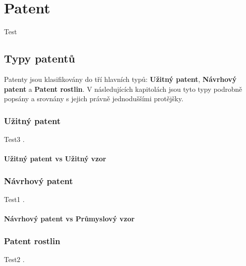 \chapter{Patent}



Test \cite{InvestopediaPatent, usptoPatent}

\section{Typy patentů}
Patenty jsou klasifikovány do tří hlavních typů: \textbf{Užitný patent}, \textbf{Návrhový patent} a \textbf{Patent rostlin}. V následujících kapitolách jsou tyto typy podrobně popsány a srovnány s jejich právně jednoduššími protějšky.

\subsection{Užitný patent}
Test3 \cite{usptoUtilityPatent}.

\subsubsection{Užitný patent vs Užitný vzor}

\subsection{Návrhový patent}
Test1 \cite{usptoDesignPatent}.

\subsubsection{Návrhový patent vs Průmyslový vzor}

\subsection{Patent rostlin}
Test2 \cite{usptoPlantPatent}.


